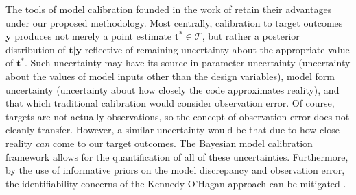 \documentclass[12pt]{article}
\begin{document}
%
%
%
%
%

The tools of model calibration founded in the work of \cite{Kennedy2001} retain their advantages under our proposed methodology.
%
Most centrally, calibration to target outcomes $\mathbf y$ produces not merely a point estimate $\mathbf t^*\in\mathcal T$, but rather a posterior distribution of $\mathbf t|\mathbf y$ reflective of remaining uncertainty about the appropriate value of $\mathbf t^*$. 
%
Such uncertainty may have its source in parameter uncertainty (uncertainty about the values of model inputs other than the design variables), model form uncertainty (uncertainty about how closely the code approximates reality), and that which traditional calibration would consider observation error. 
%
Of course,  targets are not actually observations, so the concept of observation error does not cleanly transfer. 
%
However, a similar uncertainty would be that due to how close reality \emph{can} come to our target outcomes. 
%
The Bayesian model calibration framework allows for the quantification of all of these uncertainties. 
%
Furthermore, by the use of informative priors on the model discrepancy and observation error, the identifiability concerns of the Kennedy-O'Hagan approach can be mitigated \citep{Bayarri2007,Tuo2016}.
\end{document}
